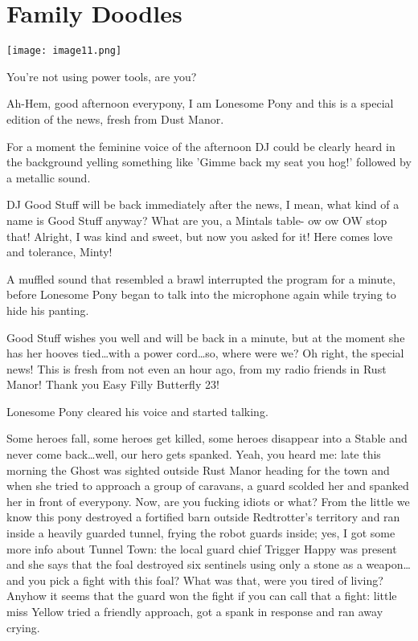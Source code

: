 \chapter{Family Doodles}

\texttt{[image: image11.png]}


\begin{intro}
    You're not using power tools, are you?
\end{intro}


{\rt Ah-Hem, good afternoon everypony, I am Lonesome Pony and this is a special edition of the news, fresh from Dust Manor.}

For a moment the feminine voice of the afternoon DJ could be clearly heard in the background yelling something like 'Gimme back my seat you hog!' followed by a metallic sound.

{\rt DJ Good Stuff will be back immediately after the news, I mean, what kind of a name is Good Stuff anyway? What are you, a Mintals table- ow ow OW stop that! Alright, I was kind and sweet, but now you asked for it! Here comes love and tolerance, Minty!}

A muffled sound that resembled a brawl interrupted the program for a minute, before Lonesome Pony began to talk into the microphone again while trying to hide his panting.

{\rt Good Stuff wishes you well and will be back in a minute, but at the moment she has her hooves tied\dots with a power cord\dots so, where were we? Oh right, the special news! This is fresh from not even an hour ago, from my radio friends in Rust Manor! Thank you Easy Filly Butterfly 23!}

Lonesome Pony cleared his voice and started talking.

{\rt Some heroes fall, some heroes get killed, some heroes disappear into a Stable and never come back\dots well, our hero gets spanked. Yeah, you heard me: late this morning the Ghost was sighted outside Rust Manor heading for the town and when she tried to approach a group of caravans, a guard scolded her and spanked her in front of everypony. Now, are you fucking idiots or what? From the little we know this pony destroyed a fortified barn outside Redtrotter's territory and ran inside a heavily guarded tunnel, frying the robot guards inside; yes, I got some more info about Tunnel Town: the local guard chief Trigger Happy was present and she says that the foal destroyed six sentinels using only a stone as a weapon\dots and you pick a fight with this foal? What was that, were you tired of living? Anyhow it seems that the guard won the fight if you can call that a fight: little miss Yellow tried a friendly approach, got a spank in response and ran away crying.}

